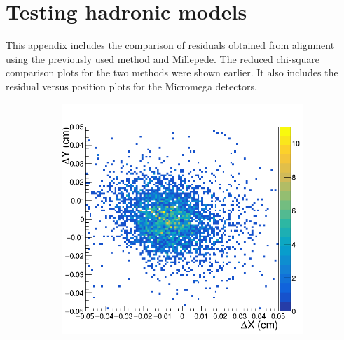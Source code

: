 \chapter{Testing hadronic models}
\label{sec:app_2}
This appendix includes the comparison of residuals obtained from alignment using the previously used method and Millepede. The reduced chi-square comparison plots for the two methods were shown earlier.
It also includes the residual versus position plots for the Micromega detectors.
\begin{figure}[h!]
\centering
 \begin{subfigure}[l]{.45\textwidth}
   \centering
   \includegraphics[width=\linewidth]{thesis_figures/alignment/Run_3211_after_prev/square/GEM1.png}


\end{subfigure}
\end{figure}
